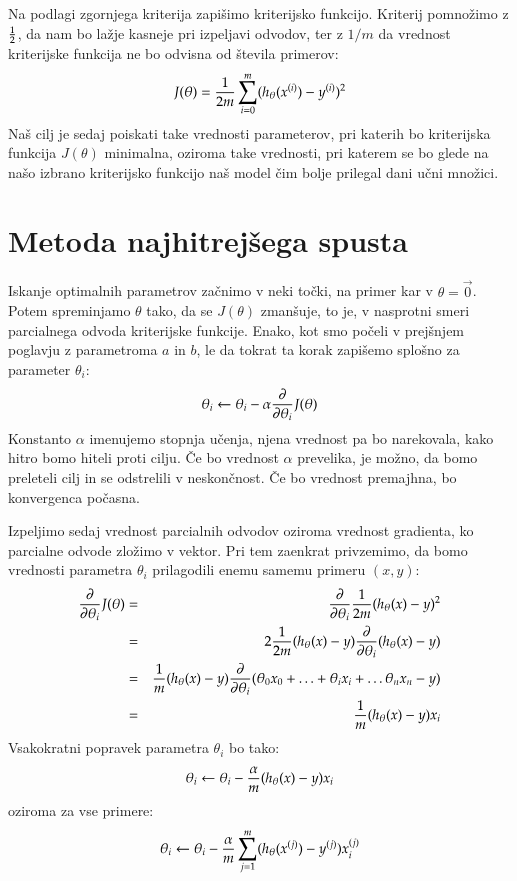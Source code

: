 Na podlagi zgornjega kriterija zapišimo kriterijsko funkcijo. Kriterij
pomnožimo z $1\over 2$, da nam bo lažje kasneje pri izpeljavi odvodov, ter z $1/m$ da vrednost kriterijske funkcija ne bo odvisna od števila primerov:
%
\begin{equation}
J(\theta)={1\over 2m}\sum_{i=0}^m(h_\theta(x^{(i)})-y^{(i)})^2
\end{equation}
%
Naš cilj je sedaj poiskati take vrednosti parameterov, pri katerih bo
kriterijska funkcija $J(\theta)$ minimalna, oziroma take vrednosti,
pri katerem se bo glede na našo izbrano kriterijsko funkcijo naš
model čim bolje prilegal dani učni množici. 

\section{Metoda najhitrejšega spusta}

Iskanje optimalnih parametrov začnimo v neki točki, na primer kar v
$\theta=\vec{0}$. Potem spreminjamo $\theta$ tako, da se $J(\theta)$
zmanšuje, to je, v nasprotni smeri parcialnega odvoda kriterijske
funkcije. Enako, kot smo počeli v prejšnjem poglavju z parametroma $a$
in $b$, le da tokrat ta korak zapišemo splošno za parameter $\theta_i$:
\begin{equation}
  \theta_i\leftarrow\theta_i-\alpha{\partial\over\partial\theta_i}J(\theta)
\end{equation}
%
Konstanto $\alpha$ imenujemo stopnja učenja, njena vrednost pa bo
narekovala, kako hitro bomo hiteli proti cilju. Če bo vrednost
$\alpha$ prevelika, je možno, da bomo preleteli cilj in se odstrelili v
neskončnost. Če bo vrednost premajhna, bo konvergenca počasna.

Izpeljimo sedaj vrednost parcialnih odvodov oziroma vrednost
gradienta, ko parcialne odvode zložimo v vektor. Pri tem zaenkrat privzemimo, da bomo vrednosti parametra $\theta_i$ prilagodili enemu samemu primeru $(x,y)$:
%
\begin{eqnarray}
{\partial\over\partial\theta_i} J(\theta) & = & {\partial\over\partial\theta_i} {1\over 2m}(h_\theta(x)-y)^2 \\
& = & 2{1\over 2m}(h_\theta(x)-y){\partial\over\partial\theta_i}(h_\theta(x)-y) \\
& = & {1\over m}(h_\theta(x)-y){\partial\over\partial\theta_i}(\theta_0 x_0 + \ldots + \theta_i x_i + \ldots \theta_n x_n - y) \\
& = & {1\over m}(h_\theta(x)-y)x_i
\end{eqnarray}
%
Vsakokratni popravek parametra $\theta_i$ bo tako:
\begin{equation}
  \theta_i\leftarrow\theta_i-{\alpha\over m}(h_\theta(x)-y)x_i
\end{equation}
oziroma za vse primere:
\begin{equation}
  \theta_i\leftarrow\theta_i-{\alpha\over m}\sum_{j=1}^m(h_\theta(x^{(j)})-y^{(j)})x_i^{(j)}
\end{equation}

